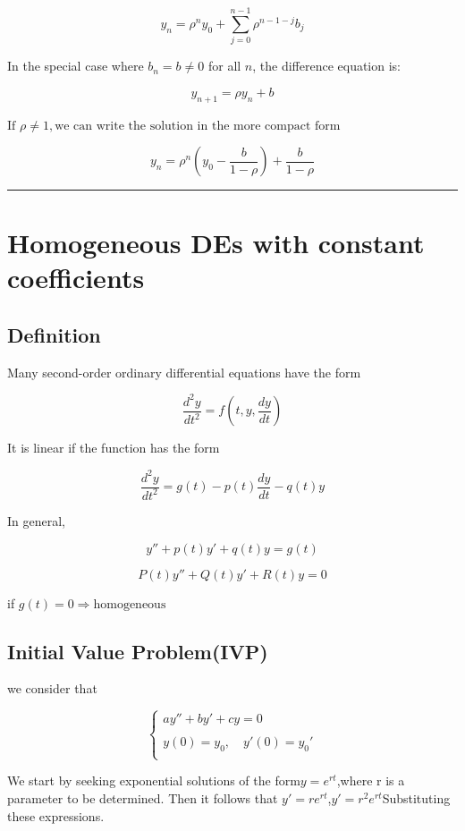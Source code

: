 \documentclass[12pt, a4paper]{article}
\theoremstyle{break}
\begin{document}
\[
y_n = \rho^n y_0 + \sum_{j = 0}^{n-1} \rho^{n-1-j} b_j
\]

In the special case where \(b_n=b\neq 0\) for all \(n\), the difference equation is:

\[
y_{n+1} = \rho y_n + b
\]

\(\text{If }\rho \neq 1, \text{we can write the solution in the more compact form}\)

\[
y_n = \rho^n (y_0 - \frac{b}{1-\rho})+\frac{b}{1 - \rho}
\]

\begin{center}\rule{0.5\linewidth}{0.5pt}\end{center}

\section{Homogeneous DEs with constant coefficients}\label{homogeneous-des-with-constant-coefficients}

\subsection{Definition}\label{definition-1}

Many second-order ordinary differential equations have the form

\[
\frac{d^2y}{dt^2} = f(t ,y ,\frac{dy}{dt})
\]

It is linear if the function has the form

\[
\frac{d^2 y}{dt^2} = g(t)- p(t)\frac{dy}{dt} - q(t) y
\]

In general,

\[
y'' + p(t)y' + q(t)y = g(t)
\]

\[
P(t)y'' + Q(t)y' + R(t)y = 0
\]

if \(g(t) = 0 \Longrightarrow \text{homogeneous}\)

\subsection{Initial Value Problem(IVP)}\label{initial-value-problemivp}

we consider that

\[
\begin{cases}  ay'' + by' +cy = 0\\ \quad \\ y(0) = y_0 ,\quad y'(0) = y_0'\\ \end{cases}
\]

 We start by seeking exponential solutions of the form\(y = e^{rt}\),where r is a parameter to be determined. Then it follows that \(y' = re^{rt}\),\(y' = r^2 e^{rt}\)Substituting these expressions.
\end{document}
